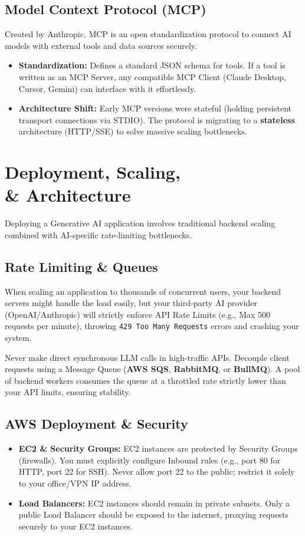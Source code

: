 \documentclass[12pt,a4paper,oneside]{book}
\begin{document}
\section{Model Context Protocol (MCP)}
Created by Anthropic, MCP is an open standardization protocol to connect AI models with external tools and data sources securely.
\begin{itemize}
    \item \textbf{Standardization:} Defines a standard JSON schema for tools. If a tool is written as an MCP Server, any compatible MCP Client (Claude Desktop, Cursor, Gemini) can interface with it effortlessly.
    \item \textbf{Architecture Shift:} Early MCP versions were stateful (holding persistent transport connections via STDIO). The protocol is migrating to a \textbf{stateless} architecture (HTTP/SSE) to solve massive scaling bottlenecks.
\end{itemize}

\chapter[Deployment, Scaling, \& Architecture]{Deployment, Scaling,\\\& Architecture}
Deploying a Generative AI application involves traditional backend scaling combined with AI-specific rate-limiting bottlenecks.

\section{Rate Limiting \& Queues}
When scaling an application to thousands of concurrent users, your backend servers might handle the load easily, but your third-party AI provider (OpenAI/Anthropic) will strictly enforce API Rate Limits (e.g., Max 500 requests per minute), throwing \texttt{429 Too Many Requests} errors and crashing your system.
\begin{bestpractice}
Never make direct synchronous LLM calls in high-traffic APIs. Decouple client requests using a Message Queue (\textbf{AWS SQS}, \textbf{RabbitMQ}, or \textbf{BullMQ}). A pool of backend workers consumes the queue at a throttled rate strictly lower than your API limits, ensuring stability.
\end{bestpractice}

\section{AWS Deployment \& Security}
\begin{itemize}
    \item \textbf{EC2 \& Security Groups:} EC2 instances are protected by Security Groups (firewalls). You must explicitly configure Inbound rules (e.g., port 80 for HTTP, port 22 for SSH). Never allow port 22 to the public; restrict it solely to your office/VPN IP address.
    \item \textbf{Load Balancers:} EC2 instances should remain in private subnets. Only a public Load Balancer should be exposed to the internet, proxying requests securely to your EC2 instances.
\end{itemize}
\end{document}
